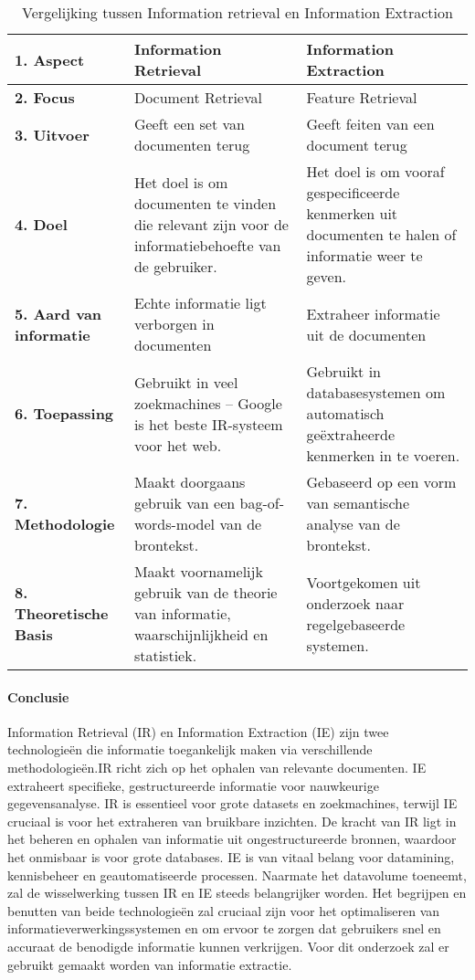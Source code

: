 \begin{table}[h!]
    \centering
    \begin{tabular}{|p{4cm}|p{5cm}|p{5cm}|}
        \hline
        \textbf{1. Aspect} & \textbf{Information Retrieval} & \textbf{Information Extraction} \\ \hline
        \textbf{2. Focus} & Document Retrieval & Feature Retrieval \\ \hline
        \textbf{3. Uitvoer} & Geeft een set van documenten terug & Geeft feiten van een document terug \\ \hline
        \textbf{4. Doel} & Het doel is om documenten te vinden die relevant zijn voor de informatiebehoefte van de gebruiker. & Het doel is om vooraf gespecificeerde kenmerken uit documenten te halen of informatie weer te geven. \\ \hline
        \textbf{5. Aard van informatie} & Echte informatie ligt verborgen in documenten & Extraheer informatie uit de documenten \\ \hline
        \textbf{6. Toepassing} & Gebruikt in veel zoekmachines – Google is het beste IR-systeem voor het web. & Gebruikt in databasesystemen om automatisch geëxtraheerde kenmerken in te voeren. \\ \hline
        \textbf{7. Methodologie} & Maakt doorgaans gebruik van een bag-of-words-model van de brontekst. & Gebaseerd op een vorm van semantische analyse van de brontekst. \\ \hline
        \textbf{8. Theoretische Basis} & Maakt voornamelijk gebruik van de theorie van informatie, waarschijnlijkheid en statistiek. & Voortgekomen uit onderzoek naar regelgebaseerde systemen. \\ \hline
\end{tabular}
    \caption{Vergelijking tussen Information retrieval en Information Extraction}
    \label{tab:ir_versus_ie}
\end{table}

\paragraph{Conclusie}
Information Retrieval (IR) en Information Extraction (IE) zijn twee technologieën die informatie toegankelijk maken via verschillende methodologieën.IR richt zich op het ophalen van relevante documenten. IE extraheert specifieke, gestructureerde informatie voor nauwkeurige gegevensanalyse. IR is essentieel voor grote datasets en zoekmachines, terwijl IE cruciaal is voor het extraheren van bruikbare inzichten. De kracht van IR ligt in het beheren en ophalen van informatie uit ongestructureerde bronnen, waardoor het onmisbaar is voor grote databases. IE is van vitaal belang voor datamining, kennisbeheer en geautomatiseerde processen. Naarmate het datavolume toeneemt, zal de wisselwerking tussen IR en IE steeds belangrijker worden. Het begrijpen en benutten van beide technologieën zal cruciaal zijn voor het optimaliseren van informatieverwerkingssystemen en om ervoor te zorgen dat gebruikers snel en accuraat de benodigde informatie kunnen verkrijgen. Voor dit onderzoek zal er gebruikt gemaakt worden van informatie extractie.

